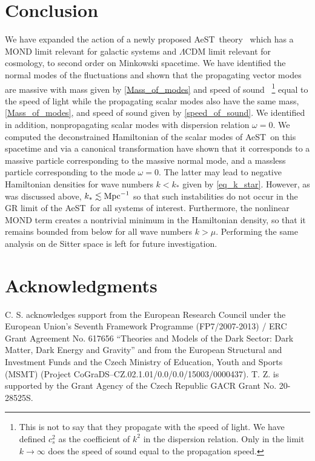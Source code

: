 \documentclass[twocolumn,prd,preprintnumbers,amsmath,amssymb,nofootinbib,superscriptaddress]{revtex4-1}
\newcommand{\AeST}{AeST~}
\newcommand{\Mpc}{\ensuremath{{\rm Mpc}}}
\begin{document}
\section{Conclusion}
\label{Sec_conclusion}
We have expanded the action of a newly proposed \AeST theory~\cite{Skordis:2020eui} which has a MOND limit relevant for galactic systems and $\Lambda$CDM limit relevant for cosmology, to second order on Minkowski spacetime. We have identified the normal modes of the fluctuations and shown that
 the propagating vector modes are massive with mass given by \eqref{Mass_of_modes} and speed of sound
~\footnote{This is not to say that they propagate with the speed of light.
We have defined $c_s^2$ as the coefficient of $k^2$ in the dispersion relation.
Only in the limit $k\rightarrow \infty$ does the speed of sound equal to the propagation speed.} equal to the speed of light 
while the propagating scalar modes  also have the same mass, \eqref{Mass_of_modes}, and speed of sound given by \eqref{speed_of_sound}. We identified in addition, 
nonpropagating scalar modes with
dispersion relation $\omega=0$. We computed the deconstrained Hamiltonian of the scalar modes of \AeST on this spacetime and via a canonical transformation have shown that it 
corresponds to a massive particle corresponding to the massive normal mode, and a massless particle corresponding to the mode $\omega=0$. The latter may lead to
negative Hamiltonian densities for wave numbers $k<k_*$ given by \eqref{eq_k_star}. However, as was discussed above, $k_*\lesssim \Mpc^{-1}$ so that such instabilities
do  not occur in the GR limit of the \AeST for all systems of interest. Furthermore, the nonlinear MOND term creates a nontrivial minimum in the Hamiltonian density, so that
it remains bounded from below for all wave numbers $k>\mu$. Performing the same analysis on de Sitter space is left for future investigation.

\section*{Acknowledgments}

C. S. acknowledges support from the European Research Council under the European Union's
Seventh Framework Programme (FP7/2007-2013) / ERC Grant Agreement No. 617656 ``Theories
 and Models of the Dark Sector: Dark Matter, Dark Energy and Gravity''  and from the European Structural and Investment Funds
and the Czech Ministry of Education, Youth and Sports (MSMT) (Project CoGraDS--CZ.02.1.01/0.0/0.0/15003/0000437). T. Z. 
is supported by the Grant Agency of the Czech Republic GACR Grant No. 20-28525S.
\end{document}
